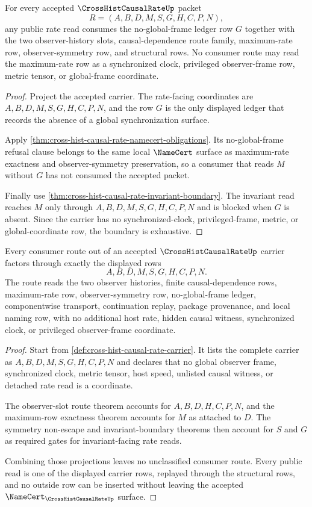 \begin{theorem}
\label{thm:cross-hist-causal-rate-no-global-frame-boundary}
For every accepted $\CrossHistCausalRateUp$ packet
$$
R=(A,B,D,M,S,G,H,C,P,N),
$$
any public rate read consumes the no-global-frame ledger row $G$ together with the two observer-history slots, causal-dependence route family, maximum-rate row, observer-symmetry row, and structural rows. No consumer route may read the maximum-rate row as a synchronized clock, privileged observer-frame row, metric tensor, or global-frame coordinate.
\end{theorem}
\begin{proof}
Project the accepted carrier. The rate-facing coordinates are $A,B,D,M,S,G,H,C,P,N$, and the row $G$ is the only displayed ledger that records the absence of a global synchronization surface.

Apply \autoref{thm:cross-hist-causal-rate-namecert-obligations}. Its no-global-frame refusal clause belongs to the same local $\NameCert$ surface as maximum-rate exactness and observer-symmetry preservation, so a consumer that reads $M$ without $G$ has not consumed the accepted packet.

Finally use \autoref{thm:cross-hist-causal-rate-invariant-boundary}. The invariant read reaches $M$ only through $A,B,D,M,S,G,H,C,P,N$ and is blocked when $G$ is absent. Since the carrier has no synchronized-clock, privileged-frame, metric, or global-coordinate row, the boundary is exhaustive.
\end{proof}

\begin{theorem}
\label{thm:cross-hist-causal-rate-consumer-route-totality}
Every consumer route out of an accepted $\CrossHistCausalRateUp$ carrier factors through exactly the displayed rows
$$
A,B,D,M,S,G,H,C,P,N.
$$
The route reads the two observer histories, finite causal-dependence rows, maximum-rate row, observer-symmetry row, no-global-frame ledger, componentwise transport, continuation replay, package provenance, and local naming row, with no additional host rate, hidden causal witness, synchronized clock, or privileged observer-frame coordinate.
\end{theorem}
\begin{proof}
Start from \autoref{def:cross-hist-causal-rate-carrier}. It lists the complete carrier as $A,B,D,M,S,G,H,C,P,N$ and declares that no global observer frame, synchronized clock, metric tensor, host speed, unlisted causal witness, or detached rate read is a coordinate.

The observer-slot route theorem accounts for $A,B,D,H,C,P,N$, and the maximum-row exactness theorem accounts for $M$ as attached to $D$. The symmetry non-escape and invariant-boundary theorems then account for $S$ and $G$ as required gates for invariant-facing rate reads.

Combining those projections leaves no unclassified consumer route. Every public read is one of the displayed carrier rows, replayed through the structural rows, and no outside row can be inserted without leaving the accepted $\NameCert_{\CrossHistCausalRateUp}$ surface.
\end{proof}

